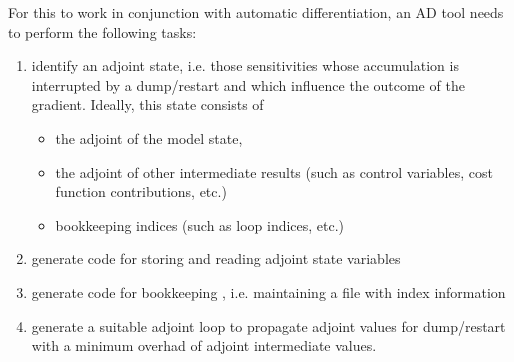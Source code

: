For this to work in conjunction with automatic differentiation, 
an AD tool needs to perform the following tasks:
%
\begin{enumerate}
%
\item
%
identify an adjoint state, i.e. those sensitivities whose
accumulation is interrupted by a dump/restart and which influence
the outcome of the gradient.
Ideally, this state consists of 
%
\begin{itemize}
%
\item
the adjoint of the model state,
%
\item
the adjoint of other intermediate results (such as control variables,
cost function contributions, etc.)
%
\item
bookkeeping indices (such as loop indices, etc.)
%
\end{itemize}
%
\item
%
generate code for storing and reading adjoint state variables
%
\item
generate code for bookkeeping , i.e. maintaining a file
with index information
%
\item
generate a suitable adjoint loop to propagate adjoint values
for dump/restart with a minimum overhad of adjoint intermediate
values.
%
\end{enumerate}

